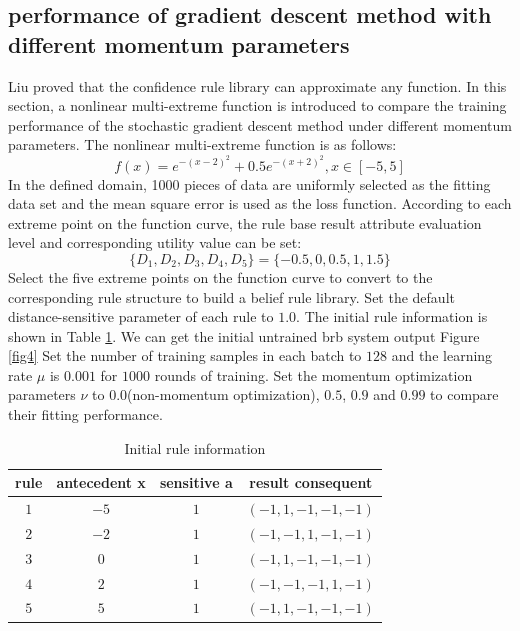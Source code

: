 \documentclass{ieeeaccess}
\begin{document}
\subsection{performance of gradient descent method with different momentum parameters}
Liu\cite{a16} proved that the confidence rule library can approximate any function.
In this section, a nonlinear multi-extreme function is introduced to compare the training performance of the stochastic gradient descent method under different momentum parameters.
The nonlinear multi-extreme function is as follows:
$$f(x)=e^{-(x-2)^2}+0.5e^{-(x+2)^2},x\in[-5,5]$$
In the defined domain, 1000 pieces of data are uniformly selected as the fitting data set and the mean square error is used as the loss function.
According to each extreme point on the function curve, the rule base result attribute evaluation level and corresponding utility value can be set:
$$\{D_1,D_2,D_3,D_4,D_5\}=\{-0.5,0,0.5,1,1.5\}$$
Select the five extreme points on the function curve to convert to the corresponding rule structure to build a belief rule library.
Set the default distance-sensitive parameter of each rule to $1.0$.
The initial rule information is shown in Table \ref{tab1}.
We can get the initial untrained brb system output Figure \ref{fig4}
Set the number of training samples in each batch to $128$ and the learning rate $\mu$ is $0.001$ for $1000$ rounds of training.
Set the momentum optimization parameters $\nu$ to 0.0(non-momentum optimization), $0.5$, $0.9$ and $0.99$ to compare their fitting performance.

\begin{table}
    \caption{Initial rule information}
    \centering
    \label{tab1}
    \begin{tabular}{cccc}
        \hline
        rule & antecedent x & sensitive a & result consequent     \\
        \hline
        $1$  & $-5$         & $1$         & $(-1, 1, -1, -1, -1)$ \\
        $2$  & $-2$         & $1$         & $(-1, -1, 1, -1, -1)$ \\
        $3$  & $0$          & $1$         & $(-1, 1, -1, -1, -1)$ \\
        $4$  & $2$          & $1$         & $(-1, -1, -1, 1, -1)$ \\
        $5$  & $5$          & $1$         & $(-1, 1, -1, -1, -1)$ \\
        \hline
    \end{tabular}
\end{table}
\end{document}
